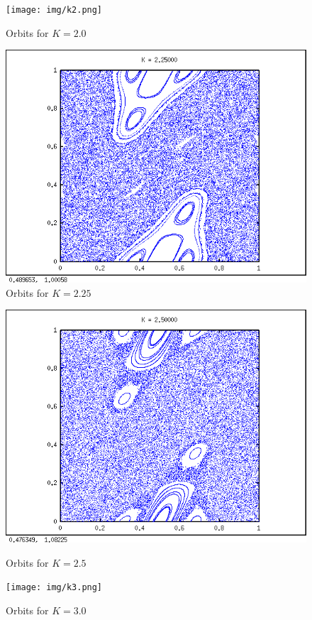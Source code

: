 \documentclass[a4paper,11pt]{article}
\begin{document}
\begin{figure}[H]
\centering
\begin{minipage}{0.5\textwidth}
\centering
\texttt{[image: img/k2.png]}
\caption{Orbits for $K = 2.0$}
\end{minipage}\hfill
\begin{minipage}{0.5\textwidth}
\centering
\includegraphics[width=\textwidth]{img/k225.png}
\caption{Orbits for $K = 2.25$}
\end{minipage}
\end{figure}

\begin{figure}[H]
\centering
\begin{minipage}{0.5\textwidth}
\centering
\includegraphics[width=\textwidth]{img/k25.png}
\caption{Orbits for $K = 2.5$}
\end{minipage}\hfill
\begin{minipage}{0.5\textwidth}
\centering
\texttt{[image: img/k3.png]}
\caption{Orbits for $K = 3.0$}
\end{minipage}
\end{figure}
\end{document}
